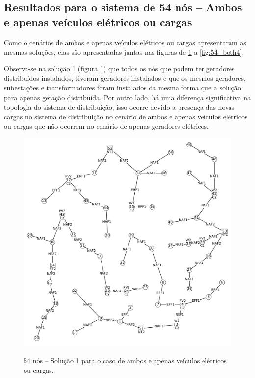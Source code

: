 \subsection{Resultados para o sistema de 54 nós -- Ambos e apenas veículos elétricos ou cargas}

Como o cenários de ambos e apenas veículos elétricos ou cargas apresentaram as mesmas soluções, elas são apresentadas juntas nas figuras de \ref{fig:54_both1} a \ref{fig:54_both4}.

Observa-se na solução 1 (figura \ref{fig:54_both1}) que todos os nós que podem ter geradores distribuídos instalados, tiveram geradores instalados e que os mesmos geradores, subestações e transformadores foram instalados da mesma forma que a solução para apenas geração distribuída. Por outro lado, há uma diferença significativa na topologia do sistema de distribuição, isso ocorre devido a presença das novas cargas no sistema de distribuição no cenário de ambos e apenas veículos elétricos ou cargas que não ocorrem no cenário de apenas geradores elétricos.

\begin{figure}[h]
 	\centering
    \caption{54 nós -- Solução 1 para o caso de ambos e apenas veículos elétricos ou cargas.}
    \includegraphics[width=1.02\textwidth]{cap4/resultados/54_bus_both1.pdf}\\
    \label{fig:54_both1}
\end{figure}


